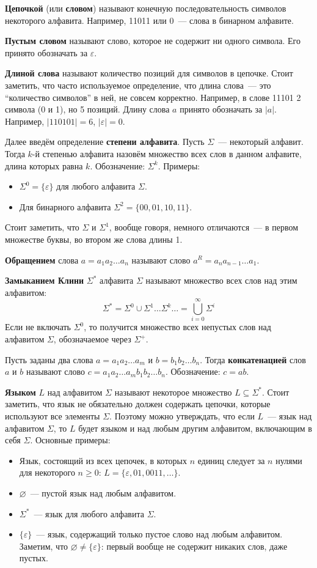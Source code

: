 \documentclass[a4paper,12pt]{article}
\begin{document}
	\textbf{Цепочкой} (или \textbf{словом}) называют конечную последовательность символов некоторого алфавита. Например, 11011 или 0~--- слова в бинарном алфавите.
	
	\textbf{Пустым словом} называют слово, которое не содержит ни одного символа. Его принято обозначать за $\varepsilon$.
	
	\textbf{Длиной слова} называют количество позиций для символов в цепочке. Стоит заметить, что часто используемое определение, что длина слова~--- это ``количество символов'' в ней, не совсем корректно. Например, в слове 11101 2 символа (0 и 1), но 5 позиций. Длину слова $a$ принято обозначать за $|a|$. Например, $|110101| = 6$, $|\varepsilon| = 0$.
	
	Далее введём определение \textbf{степени алфавита}. Пусть $\Sigma$~--- некоторый алфавит. Тогда $k$-й степенью алфавита назовём множество всех слов в данном алфавите, длина которых равна $k$. Обозначение: $\Sigma^k$.
	Примеры:
	\begin{itemize}
		\item $\Sigma^0 = \{\varepsilon\}$ для любого алфавита $\Sigma$.
		\item Для бинарного алфавита $\Sigma^2 = \{00, 01, 10, 11\}$.
	\end{itemize}
	Стоит заметить, что $\Sigma$ и $\Sigma^1$, вообще говоря, немного отличаются~--- в первом множестве буквы, во втором же слова длины 1.
	
	\textbf{Обращением} слова $a = a_1 a_2 \ldots a_n$ называют слово $a^R = a_n a_{n - 1} \ldots a_1$. 
	
	\textbf{Замыканием Клини} $\Sigma^*$ алфавита $\Sigma$ называют множество всех слов над этим алфавитом:
	\[\Sigma^* = \Sigma^0 \cup \Sigma^1 \ldots \Sigma^k \ldots = \bigcup_{i = 0}^{\infty} \Sigma^i\]
	Если не включать $\Sigma^0$, то получится множество всех непустых слов над алфавитом $\Sigma$, обозначаемое через $\Sigma^+$.
	
	Пусть заданы два слова $a = a_1 a_2 \ldots a_m$ и $b = b_1 b_2 \ldots b_n$. Тогда \textbf{конкатенацией} слов $a$ и $b$ называют слово $c = a_1 a_2 \ldots a_m b_1 b_2 \ldots b_n$. Обозначение: $c = ab$.
	
	\textbf{Языком} $L$ над алфавитом $\Sigma$ называют некоторое множество $L \subseteq \Sigma^*$. Стоит заметить, что язык не обязательно должен содержать цепочки, которые используют все элементы $\Sigma$. Поэтому можно утверждать, что если $L$~--- язык над алфавитом $\Sigma$, то $L$ будет языком и над любым другим алфавитом, включающим в себя $\Sigma$. Основные примеры:
	\begin{itemize}
		\item Язык, состоящий из всех цепочек, в которых $n$ единиц следует за $n$ нулями для некоторого $n \geqslant 0$: $L = \{\varepsilon, 01, 0011, \ldots\}$.
		\item $\varnothing$~--- пустой язык над любым алфавитом.
		\item $\Sigma^*$~--- язык для любого алфавита $\Sigma$.
		\item $\{\varepsilon\}$~--- язык, содержащий только пустое слово над любым алфавитом. Заметим, что $\varnothing \neq \{\varepsilon\}$: первый вообще не содержит никаких слов, даже пустых.
	\end{itemize}
\end{document}
